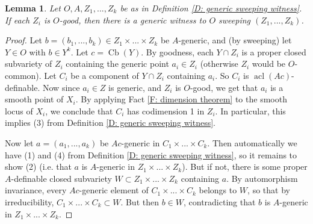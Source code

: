 \documentclass{amsart}
\newtheorem{lemma}[theorem]{Lemma}
\theoremstyle{definition}
\begin{document}
\begin{lemma}\label{L: generic sweeping witness}
   Let $O,A,Z_1,...,Z_k$ be as in Definition \ref{D: generic sweeping witness}. If each $Z_i$ is $O$-good, then there is a generic witness to $O$ sweeping $(Z_1,...,Z_k)$.
\end{lemma}
    \begin{proof}
    Let $b =(b_1,...,b_k)\in Z_1\times...\times Z_k$ be $A$-generic, and (by sweeping) let $Y\in O$ with $b\in Y^k$. Let $c=\operatorname{Cb}(Y)$. By goodness, each $Y\cap Z_i$ is a proper closed subvariety of $Z_i$ containing the generic point $a_i\in Z_i$ (otherwise $Z_i$ would be $O$-common). Let $C_i$ be a component of $Y\cap Z_i$ containing $a_i$. So $C_i$ is $\operatorname{acl}(Ac)$-definable. Now since $a_i\in Z$ is generic, and $Z_i$ is $O$-good, we get that $a_i$ is a smooth point of $X_i$. By applying Fact \ref{F: dimension theorem} to the smooth locus of $X_i$, we conclude that $C_i$ has codimension 1 in $Z_i$. In particular, this implies (3) from Definition \ref{D: generic sweeping witness}.
    
    Now let $a=(a_1,...,a_k)$ be $Ac$-generic in $C_1\times...\times C_k$. Then automatically we have (1) and (4) from Definition \ref{D: generic sweeping witness}, so it remains to show (2) (i.e. that $a$ is $A$-generic in $Z_1\times...\times Z_k$). But if not, there is some proper $A$-definable closed subvariety $W\subset Z_1\times...\times Z_k$ containing $a$. By automorphism invariance, every $Ac$-generic element of $C_1\times...\times C_k$ belongs to $W$, so that by irreducibility, $C_1\times...\times C_k\subset W$. But then $b\in W$, contradicting that $b$ is $A$-generic in $Z_1\times...\times Z_k$.


\end{proof}
\end{document}
